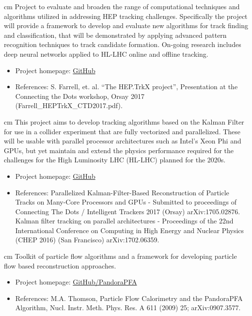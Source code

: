  cm 
Project to evaluate and broaden the range of computational techniques and algorithms utilized in addressing HEP tracking challenges. Specifically the project will provide a framework to develop and evaluate new algorithms for track finding and classification, that will be demonstrated by applying advanced pattern recognition techniques to track candidate formation. On-going research includes deep neural networks applied to HL-LHC online and offline tracking.
\begin{itemize}
\item Project homepage: \href{https://heptrkx.github.io/}{GitHub} 
\item References: S. Farrell, et. al. “The HEP.TrkX project”, Presentation at the Connecting the Dots workshop, Orsay 2017 (Farrell\_HEPTrkX\_CTD2017.pdf). 
\end{itemize}

 cm 
This project aims to develop tracking algorithms based on the Kalman Filter for use in a collider experiment that are fully vectorized and parallelized. These will be usable with parallel processor architectures such as Intel's Xeon Phi and GPUs, but yet maintain and extend the physics performance required for the challenges for the High Luminosity LHC (HL-LHC) planned for the 2020s.
\begin{itemize}
\item Project homepage: \href{http://trackreco.github.io}{GitHub} 
\item References: Parallelized Kalman-Filter-Based Reconstruction of Particle Tracks on Many-Core Processors and GPUs - Submitted to proceedings of Connecting The Dots / Intelligent Trackers 2017 (Orsay) arXiv:1705.02876. Kalman filter tracking on parallel architectures - Proceedings of the 22nd International Conference on Computing in High Energy and Nuclear Physics (CHEP 2016) (San Francisco) arXiv:1702.06359.
\end{itemize}

 cm 
Toolkit of particle flow algorithms and a framework for developing particle flow based reconstruction approaches.
\begin{itemize}
\item Project homepage: \href{https://github.com/PandoraPFA}{GitHub/PandoraPFA} 
\item References: M.A. Thomson, Particle Flow Calorimetry and the PandoraPFA Algorithm, Nucl. Instr. Meth. Phys. Res. A 611 (2009) 25; arXiv:0907.3577. 
\end{itemize}

